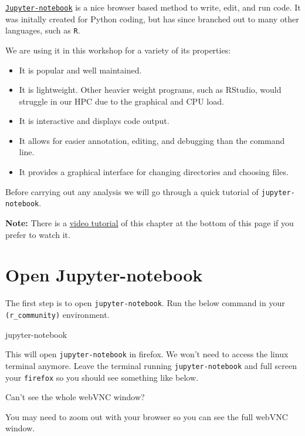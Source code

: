 \documentclass[
]{book}
\newenvironment{Shaded}{\begin{snugshade}}{\end{snugshade}}
\newcommand{\ExtensionTok}[1]{#1}
\providecommand{\tightlist}{%
  \setlength{\itemsep}{0pt}\setlength{\parskip}{0pt}}
\begin{document}
\href{https://jupyter.org/}{\texttt{Jupyter-notebook}} is a nice browser based method to write, edit, and run code. It was initally created for Python coding, but has since branched out to many other languages, such as \texttt{R}.

We are using it in this workshop for a variety of its properties:

\begin{itemize}
\tightlist
\item
  It is popular and well maintained.
\item
  It is lightweight. Other heavier weight programs, such as RStudio, would struggle in our HPC due to the graphical and CPU load.
\item
  It is interactive and displays code output.
\item
  It allows for easier annotation, editing, and debugging than the command line.
\item
  It provides a graphical interface for changing directories and choosing files.
\end{itemize}

Before carrying out any analysis we will go through a quick tutorial of \texttt{jupyter-notebook}.

\textbf{Note:} There is a \protect\hyperlink{jup_vid_tut}{video tutorial} of this chapter at the bottom of this page if you prefer to watch it.

\hypertarget{open-jupyter-notebook}{%
\section{Open Jupyter-notebook}\label{open-jupyter-notebook}}

The first step is to open \texttt{jupyter-notebook}. Run the below command in your \texttt{(r\_community)} environment.

\begin{Shaded}
\begin{Highlighting}[]
\ExtensionTok{jupyter{-}notebook}
\end{Highlighting}
\end{Shaded}

This will open \texttt{jupyter-notebook} in firefox. We won't need to access the linux terminal anymore. Leave the terminal running \texttt{jupyter-notebook} and full screen your \texttt{firefox} so you should see something like below.

Can't see the whole webVNC window?

You may need to zoom out with your browser so you can see the full webVNC window.
\end{document}
